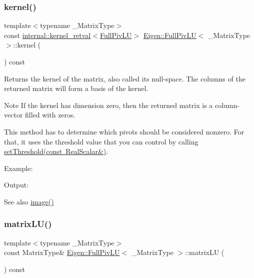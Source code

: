 \subsubsection{\texorpdfstring{kernel()}{kernel()}}
{\footnotesize\ttfamily template$<$typename \+\_\+\+Matrix\+Type$>$ \\
const \mbox{\hyperlink{struct_eigen_1_1internal_1_1kernel__retval}{internal\+::kernel\+\_\+retval}}$<$\mbox{\hyperlink{class_eigen_1_1_full_piv_l_u}{Full\+Piv\+LU}}$>$ \mbox{\hyperlink{class_eigen_1_1_full_piv_l_u}{Eigen\+::\+Full\+Piv\+LU}}$<$ \+\_\+\+Matrix\+Type $>$\+::kernel (\begin{DoxyParamCaption}{ }\end{DoxyParamCaption}) const\hspace{0.3cm}{\ttfamily [inline]}}

\begin{DoxyReturn}{Returns}
the kernel of the matrix, also called its null-\/space. The columns of the returned matrix will form a basis of the kernel.
\end{DoxyReturn}
\begin{DoxyNote}{Note}
If the kernel has dimension zero, then the returned matrix is a column-\/vector filled with zeros.

This method has to determine which pivots should be considered nonzero. For that, it uses the threshold value that you can control by calling \mbox{\hyperlink{class_eigen_1_1_full_piv_l_u_a414592d82de98f5bd075965caf56d681}{set\+Threshold(const Real\+Scalar\&)}}.
\end{DoxyNote}
Example\+: 
\begin{DoxyCodeInclude}{0}
\end{DoxyCodeInclude}
 Output\+: 
\begin{DoxyVerbInclude}
\end{DoxyVerbInclude}


\begin{DoxySeeAlso}{See also}
\mbox{\hyperlink{class_eigen_1_1_full_piv_l_u_a0893985d2dab367baa6e57c6fd0c4956}{image()}} 
\end{DoxySeeAlso}
\mbox{\label{class_eigen_1_1_full_piv_l_u_afea0b8fc707a9097d46fe358cb18bbff}} 
\subsubsection{\texorpdfstring{matrixLU()}{matrixLU()}}
{\footnotesize\ttfamily template$<$typename \+\_\+\+Matrix\+Type$>$ \\
const Matrix\+Type\& \mbox{\hyperlink{class_eigen_1_1_full_piv_l_u}{Eigen\+::\+Full\+Piv\+LU}}$<$ \+\_\+\+Matrix\+Type $>$\+::matrix\+LU (\begin{DoxyParamCaption}{ }\end{DoxyParamCaption}) const\hspace{0.3cm}{\ttfamily [inline]}}

